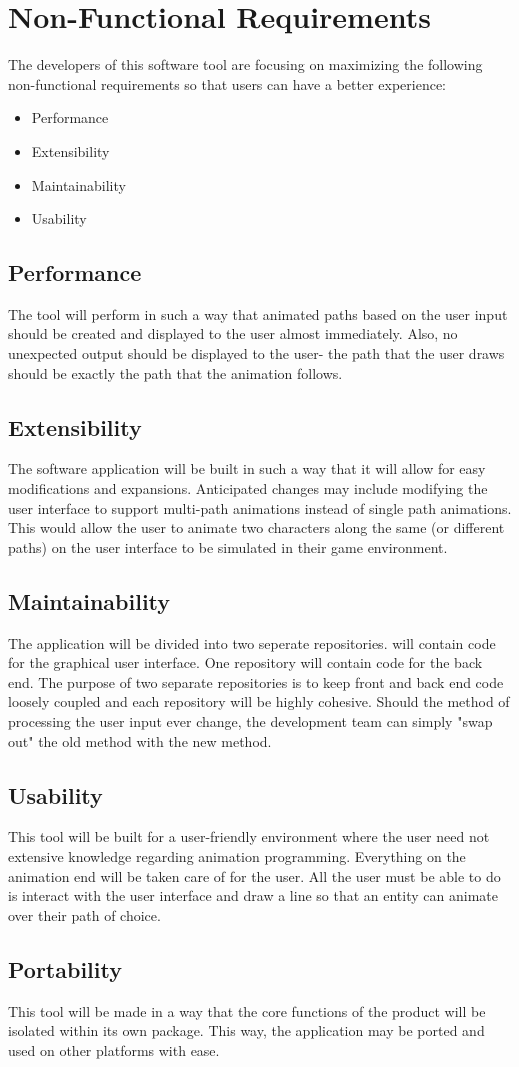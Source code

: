\section{Non-Functional Requirements}
The developers of this software tool are focusing on maximizing the following non-functional requirements so that users can have a better experience:

\begin{itemize}
 \item Performance
 \item Extensibility
 \item Maintainability
 \item Usability
\end{itemize}

\subsection{Performance}
The tool will perform in such a way that animated paths based on the user input should be created and displayed to the user almost immediately. Also, no unexpected output should be displayed to the user- the path that the user draws should be exactly the path that the animation follows.

\subsection{Extensibility}
The software application will be built in such a way that it will allow for easy modifications and expansions. Anticipated changes may include modifying the user interface to support multi-path animations instead of single path animations. This would allow the user to animate two characters along the same (or different paths) on the user interface to be simulated in their game environment.

\subsection{Maintainability}
The application will be divided into two seperate repositories. will contain code for the graphical user interface. One repository will contain code for the back end. The purpose of two separate repositories is to keep front and back end code loosely coupled and each repository will be highly cohesive. Should the method of processing the user input ever change, the development team can simply "swap out" the old method with the new method.

\subsection{Usability}
This tool will be built for a user-friendly environment where the user need not extensive knowledge regarding animation programming. Everything on the animation end will be taken care of for the user. All the user must be able to do is interact with the user interface and draw a line so that an entity can animate over their path of choice.

\subsection{Portability}
This tool will be made in a way that the core functions of the product will be isolated within its own package. This way, the application may be ported and used on other platforms with ease.
